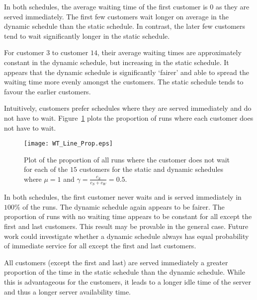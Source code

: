 In both schedules, the average waiting time of the first customer is $0$ as they are served immediately. The first few customers wait longer on average in the dynamic schedule than the static schedule. In contrast, the later few customers tend to wait significantly longer in the static schedule.

For customer $3$ to customer $14$, their average waiting times are approximately constant in the dynamic schedule, but increasing in the static schedule. It appears that the dynamic schedule is significantly `fairer' and able to spread the waiting time more evenly amongst the customers. The static schedule tends to favour the earlier customers.

Intuitively, customers prefer schedules where they are served immediately and do not have to wait. Figure~\ref{fig:No_Wait_Position} plots the proportion of runs where each customer does not have to wait.
\begin{figure}[htb]
	\centering
	\texttt{[image: WT\_Line\_Prop.eps]}
	\caption{Plot of the proportion of all runs where the customer does not wait for each of the $15$ customers for the static and dynamic schedules where $\mu = 1$ and $\gamma = \frac{c_{S}}{c_{S} + c_{W}} = 0.5$.}
	\label{fig:No_Wait_Position}
\end{figure}

In both schedules, the first customer never waits and is served immediately in $100 \%$ of the runs. The dynamic schedule again appears to be fairer. The proportion of runs with no waiting time appears to be constant for all except the first and last customers. This result may be provable in the general case. Future work could investigate whether a dynamic schedule always has equal probability of immediate service for all except the first and last customers.

All customers (except the first and last) are served immediately a greater proportion of the time in the static schedule than the dynamic schedule. While this is advantageous for the customers, it leads to a longer idle time of the server and thus a longer server availability time.

